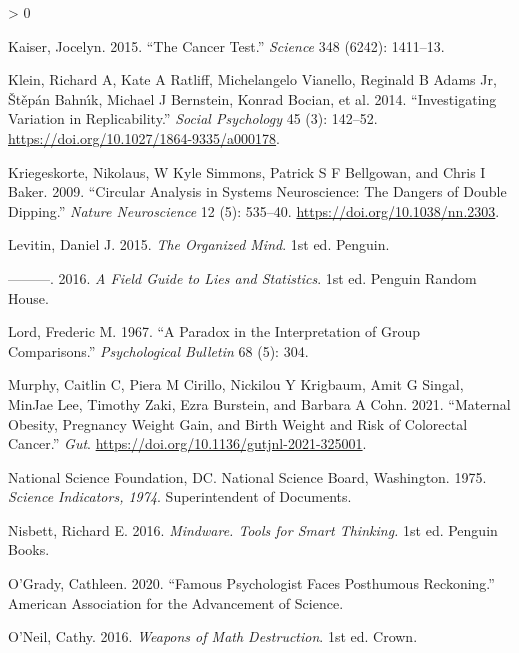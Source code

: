 \documentclass[
  10pt,
  b5paper]{book}
\newlength{\cslhangindent}
\newenvironment{CSLReferences}[2] %
 {%
  \setlength{\parindent}{0pt}
  \ifodd #1 \everypar{\setlength{\hangindent}{\cslhangindent}}\ignorespaces\fi
  \ifnum #2 > 0
  \setlength{\parskip}{#2\baselineskip}
  \fi
 }%
 {}
\begin{document}
\begin{CSLReferences}{1}{0}
\leavevmode\hypertarget{ref-r5_kaiser_2015}{}%
Kaiser, Jocelyn. 2015. {``The Cancer Test.''} \emph{Science} 348 (6242): 1411--13.

\leavevmode\hypertarget{ref-r7_klein_others_2014}{}%
Klein, Richard A, Kate A Ratliff, Michelangelo Vianello, Reginald B Adams Jr, Štěpán Bahnı́k, Michael J Bernstein, Konrad Bocian, et al. 2014. {``Investigating Variation in Replicability.''} \emph{Social Psychology} 45 (3): 142--52. \url{https://doi.org/10.1027/1864-9335/a000178}.

\leavevmode\hypertarget{ref-r8_kriegeskorte_simmons_bellgowan_baker_2009}{}%
Kriegeskorte, Nikolaus, W Kyle Simmons, Patrick S F Bellgowan, and Chris I Baker. 2009. {``Circular Analysis in Systems Neuroscience: The Dangers of Double Dipping.''} \emph{Nature Neuroscience} 12 (5): 535--40. \url{https://doi.org/10.1038/nn.2303}.

\leavevmode\hypertarget{ref-levitin_2015}{}%
Levitin, Daniel J. 2015. \emph{The Organized Mind}. 1st ed. Penguin.

\leavevmode\hypertarget{ref-levitin_2016}{}%
---------. 2016. \emph{A Field Guide to Lies and Statistics}. 1st ed. Penguin Random House.

\leavevmode\hypertarget{ref-lord1967paradox}{}%
Lord, Frederic M. 1967. {``A Paradox in the Interpretation of Group Comparisons.''} \emph{Psychological Bulletin} 68 (5): 304.

\leavevmode\hypertarget{ref-Murphygutjnl-2021-325001}{}%
Murphy, Caitlin C, Piera M Cirillo, Nickilou Y Krigbaum, Amit G Singal, MinJae Lee, Timothy Zaki, Ezra Burstein, and Barbara A Cohn. 2021. {``Maternal Obesity, Pregnancy Weight Gain, and Birth Weight and Risk of Colorectal Cancer.''} \emph{Gut}. \url{https://doi.org/10.1136/gutjnl-2021-325001}.

\leavevmode\hypertarget{ref-national1975science}{}%
National Science Foundation, DC. National Science Board, Washington. 1975. \emph{Science Indicators, 1974}. Superintendent of Documents.

\leavevmode\hypertarget{ref-nisbett}{}%
Nisbett, Richard E. 2016. \emph{Mindware. Tools for Smart Thinking.} 1st ed. Penguin Books.

\leavevmode\hypertarget{ref-o2020famous}{}%
O'Grady, Cathleen. 2020. {``Famous Psychologist Faces Posthumous Reckoning.''} American Association for the Advancement of Science.

\leavevmode\hypertarget{ref-oneil_2016}{}%
O'Neil, Cathy. 2016. \emph{Weapons of Math Destruction}. 1st ed. Crown.


\end{CSLReferences}
\end{document}
